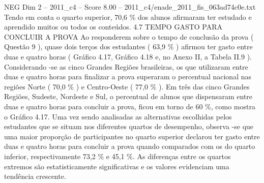 \begin{textsample}{NEG Dim 2 – 2011\_c4 – Score 8.00 – 2011\_c4/enade\_2011\_fis\_063ad74c0e.txt}
Tendo em conta o quarto superior, 70,6 \% dos alunos afirmaram ter estudado e aprendido muitos ou todos os conteúdos. 4.7 TEMPO GASTO PARA CONCLUIR A PROVA Ao responderem sobre o tempo de conclusão da prova ( Questão 9 ), quase dois terços dos estudantes ( 63,9 \% ) afirmou ter gasto entre duas e quatro horas ( Gráfico 4.17, Gráfico 4.18 e, no Anexo II, a Tabela II.9 ).
Considerando -se as cinco Grandes Regiões brasileiras, os que utilizaram entre duas e quatro horas para finalizar a prova superaram o percentual nacional nas regiões Norte ( 70,0 \% ) e Centro-Oeste ( 77,0 \% ).
Em três das cinco Grandes Regiões, Sudeste, Nordeste e Sul, o percentual de alunos que dispensaram entre duas e quatro horas para concluir a prova, ficou em torno de 60 \%, como mostra o Gráfico 4.17.
Uma vez sendo analisadas as alternativas escolhidas pelos estudantes que se situam nos diferentes quartos de desempenho, observa -se que uma maior proporção de participantes no quarto superior declarou ter gasto entre duas e quatro horas para concluir a prova quando comparados com os do quarto inferior, respectivamente 73,2 \% e 45,1 \%.
As diferenças entre os quartos extremos são estatisticamente significativas e os valores evidenciam uma tendência crescente.

\end{textsample}

